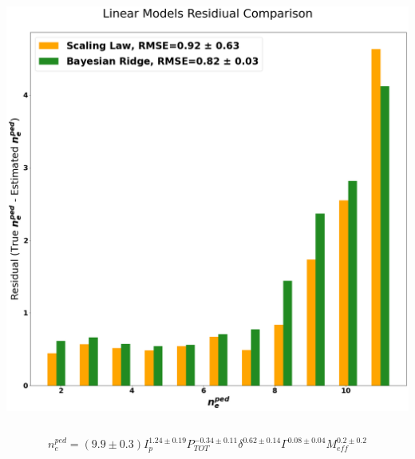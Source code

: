 \documentclass{beamer}
\begin{document}
\begin{frame}
\begin{block}{}
\begin{columns}
\includegraphics[scale=0.14]{./src/linear_comp}
\end{columns}
\end{block}
\begin{equation}
	n_e^{ped} = (9.9 \pm 0.3) I_p^{1.24 \pm 0.19} P_{TOT}^{-0.34 \pm 0.11} \delta^{0.62 \pm 0.14} \Gamma^{ 0.08 \pm 0.04} M_{eff}^{0.2 \pm 0.2}
\end{equation}

\end{frame}
\end{document}
